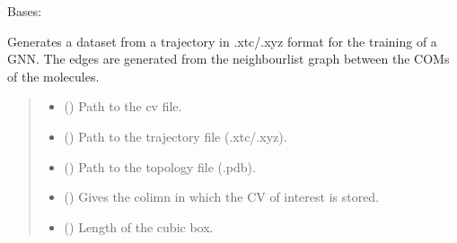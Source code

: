 \documentclass[a4paper,10pt,english]{report}
\begin{document}

\begin{fulllineitems}
\label{\detokenize{NNucleate:NNucleate.dataset.GNNMolecularTrajectory}}
\pysigstartsignatures
{}
\pysigstopsignatures
\sphinxAtStartPar
Bases: 

\sphinxAtStartPar
Generates a dataset from a trajectory in .xtc/.xyz format for the training of a GNN. The edges are generated from the neighbourlist graph between the COMs of the molecules.
\begin{quote}\begin{description}
\begin{itemize}
\item {} 
\sphinxAtStartPar
{} () \textendash{} Path to the cv file.

\item {} 
\sphinxAtStartPar
{} () \textendash{} Path to the trajectory file (.xtc/.xyz).

\item {} 
\sphinxAtStartPar
{} () \textendash{} Path to the topology file (.pdb).

\item {} 
\sphinxAtStartPar
{} () \textendash{} Gives the colimn in which the CV of interest is stored.

\item {} 
\sphinxAtStartPar
{} () \textendash{} Length of the cubic box.


\end{itemize}
\end{description}
\end{quote}
\end{fulllineitems}
\end{document}
